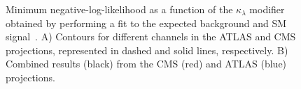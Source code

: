 \begin{figure}[ht!]
\centering
\captionsetup[subfigure]{justification=centering}
\caption[Minimum negative-log-likelihood as a function of the $\kappa_{\lambda}$ modifier obtained by performing a fit to the expected background and SM signal]{Minimum negative-log-likelihood as a function of the $\kappa_{\lambda}$ modifier obtained by performing a fit to the expected background and SM signal~\cite{yellowreport}. A) Contours for different channels in the ATLAS and CMS projections, represented in dashed and solid lines, respectively. B) Combined results (black) from the CMS (red) and ATLAS (blue) projections.}
\label{fig:coklprojection}
\end{figure}
